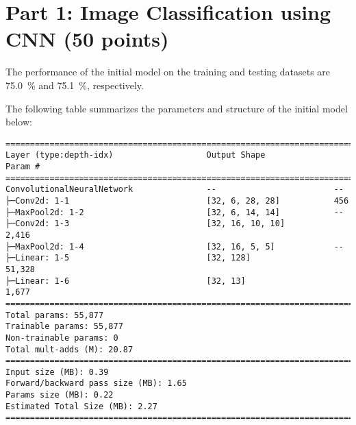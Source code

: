 \documentclass[
  coursecode={CMPE 351},
  assignmentname={Assignment 2},
  studentnumber=20053722,
  name={Bryan Hoang (16bch1)},
  draft,
  date=2020-03-07,
]{
  ltxanswer%
}
\begin{document}
  \section{Part 1: Image Classification using CNN (50 points)}

  The performance of the initial model on the training and testing datasets are \qty{75.0}{\percent} and \qty{75.1}{\percent}, respectively.

  The following table summarizes the parameters and structure of the initial model below:
  \begin{verbatim}
===============================================================================
Layer (type:depth-idx)                   Output Shape              Param #
===============================================================================
ConvolutionalNeuralNetwork               --                        --
├─Conv2d: 1-1                            [32, 6, 28, 28]           456
├─MaxPool2d: 1-2                         [32, 6, 14, 14]           --
├─Conv2d: 1-3                            [32, 16, 10, 10]          2,416
├─MaxPool2d: 1-4                         [32, 16, 5, 5]            --
├─Linear: 1-5                            [32, 128]                 51,328
├─Linear: 1-6                            [32, 13]                  1,677
===============================================================================
Total params: 55,877
Trainable params: 55,877
Non-trainable params: 0
Total mult-adds (M): 20.87
===============================================================================
Input size (MB): 0.39
Forward/backward pass size (MB): 1.65
Params size (MB): 0.22
Estimated Total Size (MB): 2.27
===============================================================================
  \end{verbatim}
\end{document}
